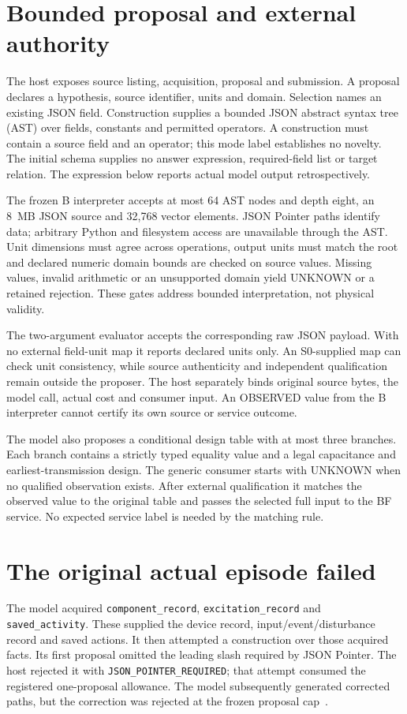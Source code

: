 \section{Bounded proposal and external authority}
The host exposes source listing, acquisition, proposal and submission. A
proposal declares a hypothesis, source identifier, units and domain. Selection
names an existing JSON field. Construction supplies a bounded JSON abstract
syntax tree (AST) over fields, constants and permitted operators. A construction
must contain a source field and an operator; this mode label establishes no
novelty. The initial schema supplies no answer expression, required-field list
or target relation. The expression below reports actual model output
retrospectively.

The frozen B interpreter accepts at most 64 AST nodes and depth eight, an
8~MB JSON source and 32,768 vector elements. JSON Pointer paths identify data;
arbitrary Python and filesystem access are unavailable through the AST. Unit
dimensions must agree across operations, output units must match the root and
declared numeric domain bounds are checked on source values. Missing values,
invalid arithmetic or an unsupported domain yield UNKNOWN or a retained
rejection. These gates address bounded interpretation, not physical validity.

The two-argument evaluator accepts the corresponding raw JSON payload. With no
external field-unit map it reports declared units only. An S0-supplied map can
check unit consistency, while source authenticity and independent qualification
remain outside the proposer. The host separately binds original source bytes,
the model call, actual cost and consumer input. An OBSERVED value from the B
interpreter cannot certify its own source or service outcome.

The model also proposes a conditional design table with at most three branches.
Each branch contains a strictly typed equality value and a legal capacitance
and earliest-transmission design. The generic consumer starts with UNKNOWN
when no qualified observation exists. After external qualification it matches
the observed value to the original table and passes the selected full input to
the BF service. No expected service label is needed by the matching rule.

\section{The original actual episode failed}
The model acquired \texttt{component\_record},
\texttt{excitation\_record} and \texttt{saved\_activity}. These supplied the
device record, input/event/disturbance record and saved actions. It then
attempted a construction over those acquired facts. Its first proposal omitted
the leading slash required by JSON Pointer. The host rejected it with
\texttt{JSON\_POINTER\_REQUIRED}; that attempt consumed the registered
one-proposal allowance. The model subsequently generated corrected paths, but
the correction was rejected at the frozen proposal cap~\cite{attempt}.

